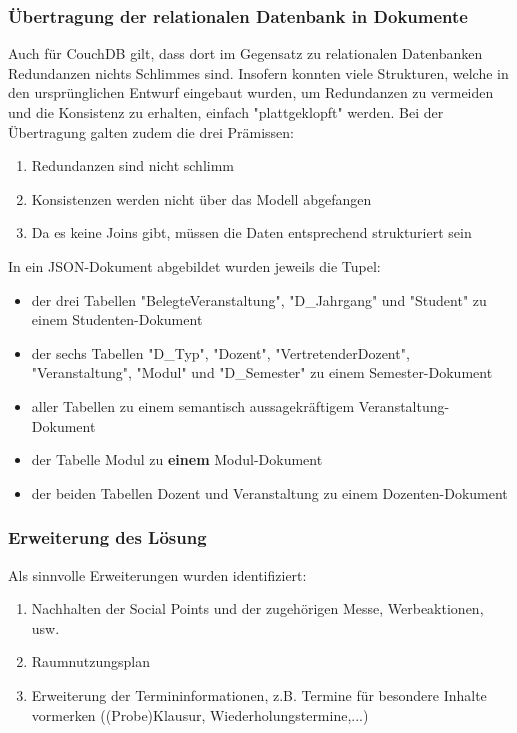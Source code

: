 \subsubsection{Übertragung der relationalen Datenbank in Dokumente}
Auch für CouchDB gilt, dass dort im Gegensatz zu relationalen Datenbanken Redundanzen nichts Schlimmes sind. Insofern konnten viele Strukturen, welche in den ursprünglichen Entwurf eingebaut wurden, um Redundanzen
zu vermeiden und die Konsistenz zu erhalten, einfach "plattgeklopft" werden.
Bei der Übertragung galten zudem die drei Prämissen:
\begin{enumerate}
    \item Redundanzen sind nicht schlimm
    \item Konsistenzen werden nicht über das Modell abgefangen
    \item  Da es keine Joins gibt, müssen die Daten entsprechend strukturiert sein
\end{enumerate}
In ein JSON-Dokument abgebildet wurden jeweils die Tupel:
\begin{itemize}
    \item der drei Tabellen "BelegteVeranstaltung", "D_Jahrgang" und "Student" zu einem Studenten-Dokument
    \item der sechs Tabellen "D_Typ", "Dozent", "VertretenderDozent", "Veranstaltung", "Modul" und "D_Semester" zu einem Semester-Dokument
    \item aller Tabellen zu einem semantisch aussagekräftigem Veranstaltung-Dokument
    \item der Tabelle Modul zu \textbf{einem} Modul-Dokument
    \item der beiden Tabellen Dozent und Veranstaltung zu einem Dozenten-Dokument
\end{itemize}

\subsubsection{Erweiterung des Lösung}
Als sinnvolle Erweiterungen wurden identifiziert:
\begin{enumerate}
    \item Nachhalten der Social Points und der zugehörigen Messe, Werbeaktionen, usw.
    \item Raumnutzungsplan
    \item Erweiterung der Termininformationen, z.B. Termine für besondere Inhalte vormerken ((Probe)Klausur, Wiederholungstermine,...)
\end{enumerate}

